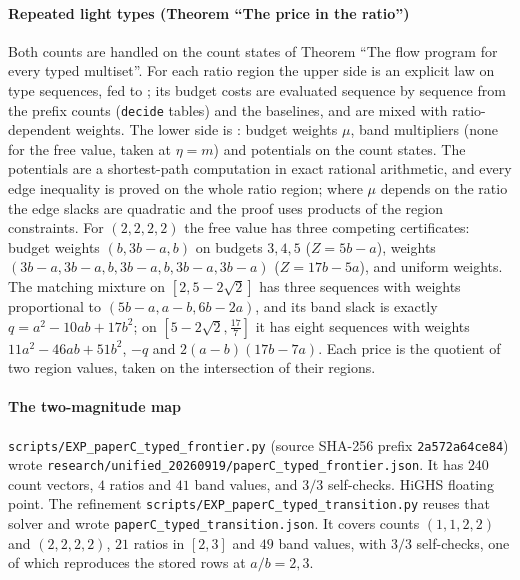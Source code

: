 \paragraph{Repeated light types (Theorem ``The price in the ratio'')} Both counts are handled on the
count states of Theorem ``The flow program for every typed multiset''. For each ratio region the
upper side is an explicit law on type sequences, fed to ; its budget
costs are evaluated sequence by sequence from the prefix counts (\texttt{decide} tables) and the
baselines, and are mixed with ratio-dependent weights. The lower side is : budget
weights $\mu$, band multipliers (none for the free value, taken at $\eta=m$) and potentials on the
count states. The potentials are a shortest-path computation in exact rational arithmetic, and
every edge inequality is proved on the whole ratio region; where $\mu$ depends on the ratio the
edge slacks are quadratic and the proof uses products of the region constraints. For $(2,2,2,2)$
the free value has three competing certificates: budget weights $(b,3b-a,b)$ on budgets $3,4,5$
($Z=5b-a$), weights $(3b-a,3b-a,b,3b-a,b,3b-a,3b-a)$ ($Z=17b-5a$), and uniform weights. The
matching mixture on $[2,5-2\sqrt2]$ has three sequences with weights proportional to
$(5b-a,a-b,6b-2a)$, and its band slack is exactly $q=a^2-10ab+17b^2$; on $[5-2\sqrt2,\frac{17}7]$
it has eight sequences with weights $11a^2-46ab+51b^2$, $-q$ and $2(a-b)(17b-7a)$. Each price is the
quotient of two region values, taken on the intersection of their regions.

\paragraph{The two-magnitude map} \texttt{scripts/EXP\_paperC\_typed\_frontier.py} (source
SHA-256 prefix \texttt{2a572a64ce84}) wrote
\texttt{research/unified\_20260919/paperC\_typed\_frontier.json}. It has $240$ count vectors,
$4$ ratios and $41$ band values, and $3/3$ self-checks. HiGHS floating point. The refinement
\texttt{scripts/EXP\_paperC\_typed\_transition.py} reuses that solver and wrote
\texttt{paperC\_typed\_transition.json}. It covers counts $(1,1,2,2)$ and $(2,2,2,2)$, $21$
ratios in $[2,3]$ and $49$ band values, with $3/3$ self-checks, one of which reproduces the
stored rows at $a/b=2,3$. \NUM{}

